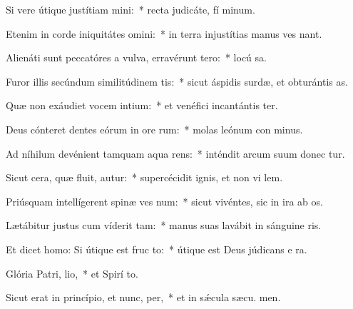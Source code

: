 \item Si vere útique justítiam mini:~* recta judicáte, fí minum.
\item Etenim in corde iniquitátes omini:~* in terra injustítias manus ves nant.
\item Alienáti sunt peccatóres a vulva, erravérunt  tero:~* locú  sa.
\item Furor illis secúndum similitúdinem tis:~* sicut áspidis surdæ, et obturántis  as.
\item Quæ non exáudiet vocem intium:~* et venéfici incantántis ter.
\item Deus cónteret dentes eórum in ore rum:~* molas leónum con minus.
\item Ad níhilum devénient tamquam aqua rens:~* inténdit arcum suum donec tur.
\item Sicut cera, quæ fluit, autur:~* supercécidit ignis, et non vi lem.
\item Priúsquam intellígerent spinæ ves num:~* sicut vivéntes, sic in ira ab os.
\item Lætábitur justus cum víderit tam:~* manus suas lavábit in sánguine ris.
\item Et dicet homo: Si útique est fruc to:~* útique est Deus júdicans e  ra.
\item Glória Patri,  lio,~* et Spirí to.
\item Sicut erat in princípio, et nunc,  per,~* et in sǽcula sæcu. men.
